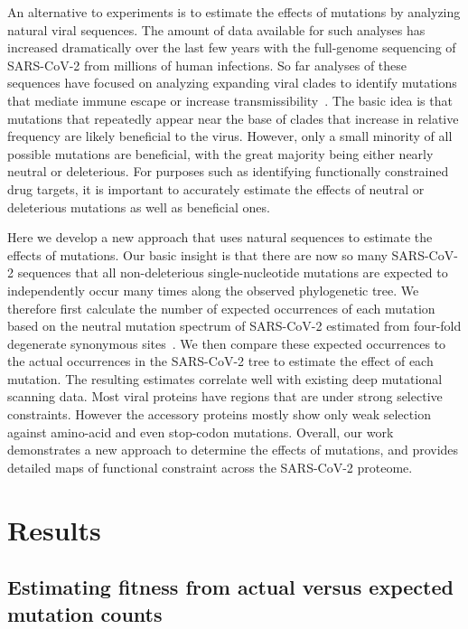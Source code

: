 \documentclass[9pt,twocolumn,twoside]{gsajnl_modified}
\newcommand\jdbcomment[1]{\textcolor{red}{[#1]}}
\begin{document}
An alternative to experiments is to estimate the effects of mutations by analyzing natural viral sequences.
The amount of data available for such analyses has increased dramatically over the last few years with the full-genome sequencing of SARS-CoV-2 from millions of human infections.
So far analyses of these sequences have focused on analyzing expanding viral clades to identify mutations that mediate immune escape or increase transmissibility~\citep{obermeyer2022analysis,lee2022inferring}.
The basic idea is that mutations that repeatedly appear near the base of clades that increase in relative frequency are likely beneficial to the virus.
However, only a small minority of all possible mutations are beneficial, with the great majority being either nearly neutral or deleterious.
For purposes such as identifying functionally constrained drug targets, it is important to accurately estimate the effects of neutral or deleterious mutations as well as beneficial ones.

Here we develop a new approach that uses natural sequences to estimate the effects of mutations.
Our basic insight is that there are now so many SARS-CoV-2 sequences that all non-deleterious single-nucleotide mutations are expected to independently occur many times along the observed phylogenetic tree.
We therefore first calculate the number of expected occurrences of each mutation based on the neutral mutation spectrum of SARS-CoV-2 estimated from four-fold degenerate synonymous sites~\citep{bloom2022evolution}.
We then compare these expected occurrences to the actual occurrences in the SARS-CoV-2 tree to estimate the effect of each mutation.
The resulting estimates correlate well with existing deep mutational scanning data.
Most viral proteins have regions that are under strong selective constraints.
However the accessory proteins mostly show only weak selection against amino-acid and even stop-codon mutations.
Overall, our work demonstrates a new approach to determine the effects of mutations, and provides detailed maps of functional constraint across the SARS-CoV-2 proteome.

\section{Results}

\subsection{Estimating fitness from actual versus expected mutation counts}
\end{document}
